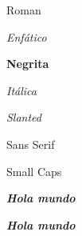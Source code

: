 \documentclass{book}
\begin{document}
{\rm Roman}

{\em Enfático}

{\bf Negrita}

{\it Itálica}

{\sl Slanted}

{\sf Sans Serif}

{\sc Small Caps}

{\it\bf Hola mundo}

\textbf{\textit{Hola mundo}}
\end{document}
